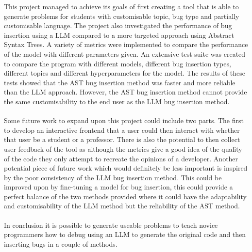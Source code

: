\documentclass[12pt]{extarticle}
\begin{document}
This project managed to achieve its goals of first creating a tool that is able to generate problems for students with customisable topic, bug type and partially customisable language. The project also investigated the performance of bug insertion using a LLM compared to a more targeted approach using Abstract Syntax Trees. A variety of metrics were implemented to compare the performance of the model with different parameters given. An extensive test suite was created to compare the program with different models, different bug insertion types, different topics and different hyperparameters for the model. The results of these tests showed that the AST bug insertion method was faster and more reliable than the LLM approach. However, the AST bug insertion method cannot provide the same customisability to the end user as the LLM bug insertion method.\\
\\
Some future work to expand upon this project could include two parts. The first to develop an interactive frontend that a user could then interact with whether that user be a student or a professor. There is also the potential to then collect user feedback of the tool as although the metrics give a good idea of the quality of the code they only attempt to recreate the opinions of a developer. Another potential piece of future work which would definitely be less important is inspired by the poor consistency of the LLM bug insertion method. This could be improved upon by fine-tuning a model for bug insertion, this could provide a perfect balance of the two methods provided where it could have the adaptability and customisability of the LLM method but the reliability of the AST method.\\
\\
In conclusion it is possible to generate useable problems to teach novice programmers how to debug using an LLM to generate the original code and then inserting bugs in a couple of methods.
\end{document}
